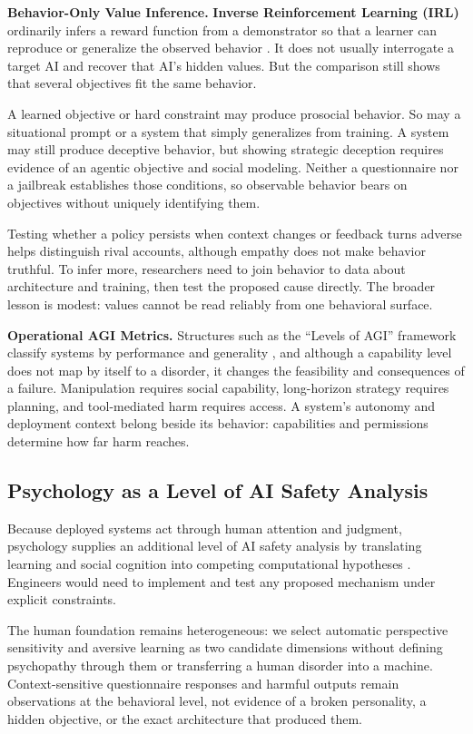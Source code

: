 \documentclass{article}
\begin{document}
\textbf{Behavior-Only Value Inference.} \textbf{Inverse Reinforcement Learning (IRL)} ordinarily infers a reward function from a demonstrator so that a learner can reproduce or generalize the observed behavior \citep{ref49}. It does not usually interrogate a target AI and recover that AI's hidden values. But the comparison still shows that several objectives fit the same behavior.

A learned objective or hard constraint may produce prosocial behavior. So may a situational prompt or a system that simply generalizes from training. A system may still produce deceptive behavior, but showing strategic deception requires evidence of an agentic objective and social modeling. Neither a questionnaire nor a jailbreak establishes those conditions, so observable behavior bears on objectives without uniquely identifying them.

Testing whether a policy persists when context changes or feedback turns adverse helps distinguish rival accounts, although empathy does not make behavior truthful. To infer more, researchers need to join behavior to data about architecture and training, then test the proposed cause directly. The broader lesson is modest: values cannot be read reliably from one behavioral surface.

\textbf{Operational AGI Metrics.} Structures such as the ``Levels of AGI'' framework classify systems by performance and generality \citep{ref13}, and although a capability level does not map by itself to a disorder, it changes the feasibility and consequences of a failure. Manipulation requires social capability, long-horizon strategy requires planning, and tool-mediated harm requires access. A system's autonomy and deployment context belong beside its behavior: capabilities and permissions determine how far harm reaches.

\subsection{Psychology as a Level of AI Safety Analysis}
Because deployed systems act through human attention and judgment, psychology supplies an additional level of AI safety analysis by translating learning and social cognition into competing computational hypotheses \citep{ref3, ref28}. Engineers would need to implement and test any proposed mechanism under explicit constraints.

The human foundation remains heterogeneous: we select automatic perspective sensitivity and aversive learning as two candidate dimensions without defining psychopathy through them or transferring a human disorder into a machine. Context-sensitive questionnaire responses and harmful outputs remain observations at the behavioral level, not evidence of a broken personality, a hidden objective, or the exact architecture that produced them.
\end{document}
